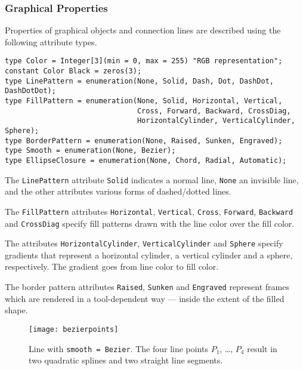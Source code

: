 \subsubsection{Graphical Properties}\label{graphical-properties}

Properties of graphical objects and connection lines are described using the following attribute types.
\begin{lstlisting}[language=modelica]
type Color = Integer[3](min = 0, max = 255) "RGB representation";
constant Color Black = zeros(3);
type LinePattern = enumeration(None, Solid, Dash, Dot, DashDot, DashDotDot);
type FillPattern = enumeration(None, Solid, Horizontal, Vertical,
                               Cross, Forward, Backward, CrossDiag,
                               HorizontalCylinder, VerticalCylinder, Sphere);
type BorderPattern = enumeration(None, Raised, Sunken, Engraved);
type Smooth = enumeration(None, Bezier);
type EllipseClosure = enumeration(None, Chord, Radial, Automatic);
\end{lstlisting}%
The \lstinline!LinePattern! attribute \lstinline!Solid! indicates a normal line, \lstinline!None! an invisible line, and the other attributes various forms of dashed/dotted lines.

The \lstinline!FillPattern! attributes \lstinline!Horizontal!, \lstinline!Vertical!, \lstinline!Cross!, \lstinline!Forward!, \lstinline!Backward! and \lstinline!CrossDiag! specify fill patterns drawn with the line color over the fill color.

The attributes \lstinline!HorizontalCylinder!, \lstinline!VerticalCylinder! and \lstinline!Sphere! specify gradients that represent a horizontal cylinder, a vertical cylinder and a sphere, respectively.
The gradient goes from line color to fill color.

The border pattern attributes \lstinline!Raised!, \lstinline!Sunken! and \lstinline!Engraved! represent frames which are rendered in a tool-dependent way --- inside the extent of the filled shape.

\begin{figure}[H]
  \begin{center}
    \texttt{[image: bezierpoints]}
  \end{center}
  \caption{%
    Line with \lstinline!smooth = Bezier!.
    The four line points $P_{1}$, \ldots{}, $P_{4}$ result in two quadratic splines and two straight line segments.
  }\label{fig:smooth-bezier}
\end{figure}

